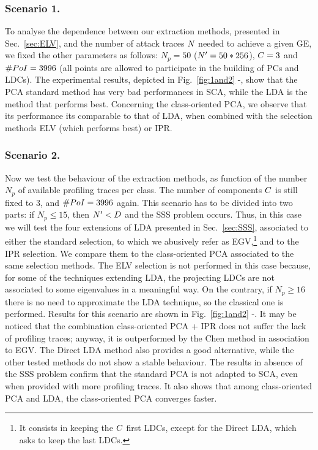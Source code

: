 \subsubsection{Scenario 1.}
To analyse the dependence between our extraction methods, presented in Sec.~\ref{sec:ELV}, and the number of attack traces $\numTraces[]$ needed to achieve a given GE, we fixed the other parameters as follows: $N_p=50$ ($\numTraces[]'=50*256$), $\newTraceLength = 3$ and $\numPoI = 3996$ (all points are allowed to participate in the building of PCs and LDCs). The experimental results, depicted in Fig.~\ref{fig:1and2} -, show that the PCA standard method has very bad performances in SCA, while the LDA is the method that performs best. Concerning the class-oriented PCA, we observe that its performance its comparable to that of LDA, when combined with the selection methods ELV (which performs best) or IPR.  


\subsubsection{Scenario 2.}
Now we test the behaviour of the extraction methods, as function of the number $N_p$ of available profiling traces per class. The number of components $\newTraceLength$ is still fixed to 3, and $\numPoI=3996$ again. This scenario has to be divided into two parts: if $N_p\leq 15$, then $\numTraces[]'<\traceLength$ and the SSS problem occurs. Thus, in this case we will test the four extensions of LDA presented in Sec.~\ref{sec:SSS}, associated to either the standard selection, to which we abusively refer as EGV,\footnote{It consists in keeping the $\newTraceLength$ first LDCs, except for the Direct LDA, which asks to keep the last LDCs.} and to the IPR selection.  We compare them to the class-oriented PCA associated to the same selection methods. The ELV selection is not performed in this case because, for some of the techniques extending LDA, the projecting LDCs are not associated to some eigenvalues in a meaningful way. On the contrary, if $N_p\geq 16$ there is no need to approximate the LDA technique, so the classical one is performed. Results for this scenario are shown in Fig.~\ref{fig:1and2} -. It may be noticed that the combination class-oriented PCA + IPR does not suffer the lack of profiling traces; anyway, it is outperformed by the Chen method in association to EGV. The Direct LDA method also provides a good alternative, while the other tested methods do not show a stable behaviour. The results in absence of the SSS problem confirm that the standard PCA is not adapted to SCA, even when provided with more profiling traces. It also shows that among class-oriented PCA and LDA, the class-oriented PCA converges faster.



